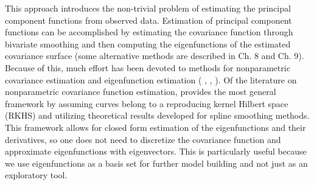 This approach introduces the non-trivial problem of estimating the principal component functions from observed data. Estimation of principal component functions can be accomplished by estimating the covariance function through bivariate smoothing and then computing the eigenfunctions of the estimated covariance surface (some alternative methods are described in \cite{FDA} Ch. 8 and Ch. 9). Because of this, much effort has been devoted to methods for nonparametric covariance estimation and eigenfunction estimation ( \cite{Yao:2005cv}, \cite{Li:2007dn}, \cite{Cai:2010vr}).  Of the literature on nonparametric covariance function estimation, \cite{Cai:2010vr} provides the most general framework by assuming curves belong to a reproducing kernel Hilbert space (RKHS) and utilizing theoretical results developed for spline smoothing methods. This framework allows for closed form estimation of the eigenfunctions and their derivatives, so one does not need to discretize the covariance function and approximate eigenfunctions with eigenvectors.  This is particularly useful because we use eigenfunctions as a basis set for further model building and not just as an exploratory tool. 

